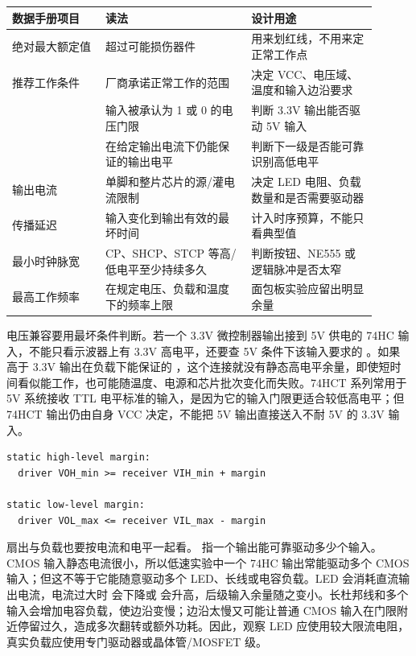 \begin{longtable}{L{0.23\linewidth}L{0.36\linewidth}L{0.31\linewidth}}
\toprule
数据手册项目 & 读法 & 设计用途 \\
\midrule
绝对最大额定值 & 超过可能损伤器件 & 用来划红线，不用来定正常工作点 \\\tablerowrule
推荐工作条件 & 厂商承诺正常工作的范围 & 决定 VCC、电压域、温度和输入边沿要求 \\\tablerowrule
{} & 输入被承认为 1 或 0 的电压门限 & 判断 3.3V 输出能否驱动 5V 输入 \\\tablerowrule
{} & 在给定输出电流下仍能保证的输出电平 & 判断下一级是否能可靠识别高低电平 \\\tablerowrule
输出电流 & 单脚和整片芯片的源/灌电流限制 & 决定 LED 电阻、负载数量和是否需要驱动器 \\\tablerowrule
传播延迟 & 输入变化到输出有效的最坏时间 & 计入时序预算，不能只看典型值 \\\tablerowrule
最小时钟脉宽 & CP、SHCP、STCP 等高/低电平至少持续多久 & 判断按钮、NE555 或逻辑脉冲是否太窄 \\\tablerowrule
最高工作频率 & 在规定电压、负载和温度下的频率上限 & 面包板实验应留出明显余量 \\
\bottomrule
\end{longtable}

电压兼容要用最坏条件判断。若一个 3.3V 微控制器输出接到 5V 供电的 74HC 输入，不能只看示波器上有 3.3V 高电平，还要查 5V 条件下该输入要求的 。如果  高于 3.3V 输出在负载下能保证的 ，这个连接就没有静态高电平余量，即使短时间看似能工作，也可能随温度、电源和芯片批次变化而失败。74HCT 系列常用于 5V 系统接收 TTL 电平标准的输入，是因为它的输入门限更适合较低高电平；但 74HCT 输出仍由自身 VCC 决定，不能把 5V 输出直接送入不耐 5V 的 3.3V 输入。

\begin{lstlisting}
static high-level margin:
  driver VOH_min >= receiver VIH_min + margin

static low-level margin:
  driver VOL_max <= receiver VIL_max - margin
\end{lstlisting}

扇出与负载也要按电流和电平一起看。 指一个输出能可靠驱动多少个输入。CMOS 输入静态电流很小，所以低速实验中一个 74HC 输出常能驱动多个 CMOS 输入；但这不等于它能随意驱动多个 LED、长线或电容负载。LED 会消耗直流输出电流，电流过大时  会下降或  会升高，后级输入余量随之变小。长杜邦线和多个输入会增加电容负载，使边沿变慢；边沿太慢又可能让普通 CMOS 输入在门限附近停留过久，造成多次翻转或额外功耗。因此，观察 LED 应使用较大限流电阻，真实负载应使用专门驱动器或晶体管/MOSFET 级。

